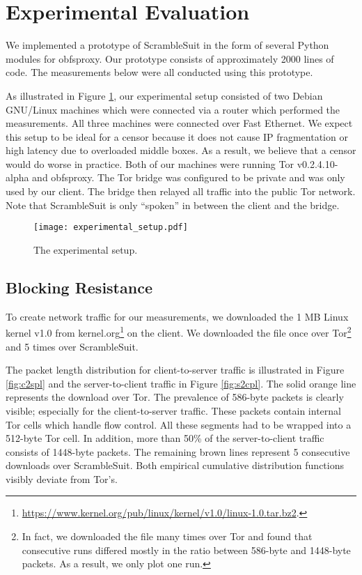 \documentclass{sig-alternate}
\newcommand{\pt}{\textsf{ScrambleSuit}}
\numberwithin{enumi}{section}
\numberwithin{notesctr}{section}
\begin{document}
\section{Experimental Evaluation}
\label{sec:experimental_evaluation}


We implemented a prototype of \pt{} in the form of several Python modules for obfsproxy. Our
prototype consists of approximately 2000 lines of code. The measurements below were all
conducted using this prototype.

As illustrated in Figure \ref{fig:experimental_setup}, our experimental setup consisted of two
Debian GNU/Linux machines which were connected via a router which performed the measurements. All
three machines were connected over Fast Ethernet. We expect this setup to be ideal for a censor
because it does not cause IP fragmentation or high latency due to overloaded middle boxes. As a
result, we believe that a censor would do worse in practice. Both of our machines were running Tor
v0.2.4.10-alpha and obfsproxy. The Tor bridge was configured to be private and was only used by
our client. The bridge then relayed all traffic into the public Tor network. Note that \pt{} is only
``spoken'' in between the client and the bridge.

\begin{figure}[h]
\centering
\begin{center}
		\texttt{[image: experimental\_setup.pdf]}
	\end{center}
	\caption{The experimental setup.}
	\label{fig:experimental_setup}
\end{figure}


\subsection{Blocking Resistance}
\label{sec:blocking_resistance}
To create network traffic for our measurements, we downloaded the 1 MB Linux kernel v1.0 from
kernel.org\footnote{\url{https://www.kernel.org/pub/linux/kernel/v1.0/linux-1.0.tar.bz2}.} on
the client. We downloaded the file once over Tor\footnote{In fact, we downloaded the file many times
over Tor and found that consecutive runs differed mostly in the ratio between 586-byte and 1448-byte
packets. As a result, we only plot one run.} and 5 times over \pt{}.

The packet length distribution for client-to-server traffic is illustrated in Figure \ref{fig:c2spl}
and the server-to-client traffic in Figure \ref{fig:s2cpl}. The solid orange line represents the
download over Tor. The prevalence of 586-byte packets is clearly visible; especially for the
client-to-server traffic. These packets contain internal Tor cells which handle flow control. All
these segments had to be wrapped into a 512-byte Tor cell. In addition, more than 50\% of the
server-to-client traffic consists of 1448-byte packets. The remaining brown lines represent 5
consecutive downloads over \pt{}. Both empirical cumulative distribution functions visibly deviate
from Tor's.
\end{document}
